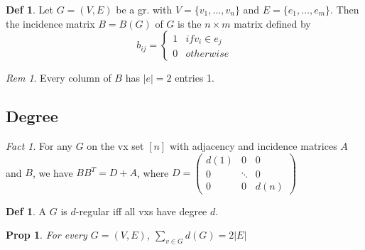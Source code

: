 \documentclass[11pt, fleqn, a4paper, landscape]{article}
\theoremstyle{plain} %
\newtheorem{pro}[thm]{Prop}
\theoremstyle{remark} %
\newtheorem{rem}[thm]{Rem}
\newtheorem{nota}[thm]{Not}
\newtheorem{fact}{Fact}
\theoremstyle{definition} %
\newtheorem{defi}[thm]{Def}
\begin{document}
\begin{multicols}{5}
\begin{defi}
Let $G = (V,E)$ be a gr. with $V = \{v_1, \dots , v_n\}$ and $E = \{e_1, \dots , e_m\}$. Then the incidence matrix $B = B(G)$ of $G$ is the $n\times m$ matrix defined by \[b_{ij}=\begin{cases}1 & if v_i\in e_j\\ 0 & otherwise\end{cases}\]
\end{defi}
\addtocounter{thm}{1}
\begin{rem}
Every column of $B$ has $|e| = 2$ entries 1.
\end{rem}

\subsection{Degree}

\addtocounter{thm}{1}
\addtocounter{thm}{1} 
\addtocounter{thm}{1}
\begin{fact}
For any $G$ on the vx set $[n]$ with adjacency and incidence matrices $A$ and $B$, we have $BB^T = D + A$, where
$D=
\begin{pmatrix}
d(1) & 0 & 0  \\
0 & \ddots & 0  \\
0 & 0 & d(n)  
\end{pmatrix}
$  
\end{fact}

\addtocounter{thm}{1}

\begin{defi}
A $G$ is $d$-regular iff all vxs have degree $d$.
\end{defi}
\addtocounter{thm}{1}
\begin{pro}
For every $G = (V,E)$, $\sum_{v\in G}d(G)=2|E|$
\end{pro}


\end{multicols}
\end{document}

